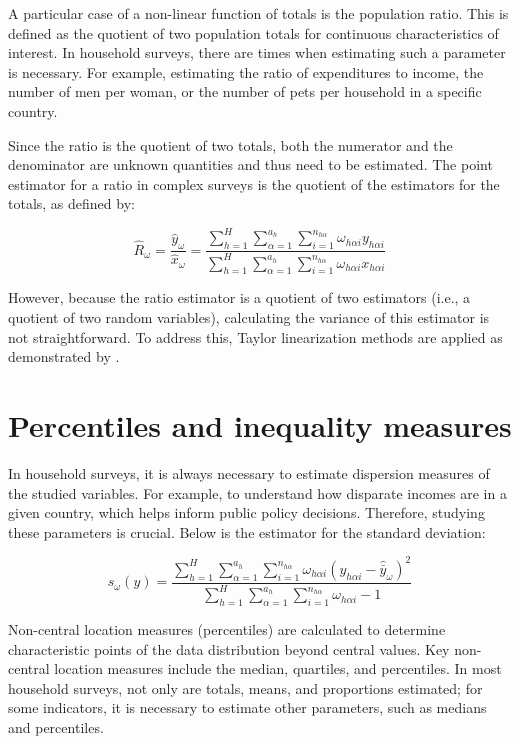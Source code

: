 \documentclass[
  12pt,
]{book}
\begin{document}
A particular case of a non-linear function of totals is the population ratio. This is defined as the quotient of two population totals for continuous characteristics of interest. In household surveys, there are times when estimating such a parameter is necessary. For example, estimating the ratio of expenditures to income, the number of men per woman, or the number of pets per household in a specific country.

Since the ratio is the quotient of two totals, both the numerator and the denominator are unknown quantities and thus need to be estimated. The point estimator for a ratio in complex surveys is the quotient of the estimators for the totals, as defined by:

\[
\hat{R}_{\omega} = \frac{\hat{y}_{\omega}}{\hat{x}_{\omega}}
= \frac{\sum_{h=1}^{H}\sum_{\alpha=1}^{a_{h}}\sum_{i=1}^{n_{h\alpha}}\omega_{h\alpha i}y_{h\alpha i}}{\sum_{h=1}^{H}\sum_{\alpha=1}^{a_{h}}\sum_{i=1}^{n_{h\alpha}}\omega_{h\alpha i}x_{h\alpha i}}
\]

However, because the ratio estimator is a quotient of two estimators (i.e., a quotient of two random variables), calculating the variance of this estimator is not straightforward. To address this, Taylor linearization methods are applied as demonstrated by \citet{Gutierrez_2016}.

\section{Percentiles and inequality measures}\label{percentiles-and-inequality-measures}

In household surveys, it is always necessary to estimate dispersion measures of the studied variables. For example, to understand how disparate incomes are in a given country, which helps inform public policy decisions. Therefore, studying these parameters is crucial. Below is the estimator for the standard deviation:

\[
s_{\omega}(y) = \frac{\sum_{h=1}^{H}\sum_{\alpha=1}^{a_{h}}\sum_{i=1}^{n_{h\alpha}}\omega_{h\alpha i}(y_{h\alpha i}-\hat{\bar{y}}_{\omega})^{2}}{\sum_{h=1}^{H}\sum_{\alpha=1}^{a_{h}}\sum_{i=1}^{n_{h\alpha}}\omega_{h\alpha i}-1}
\]

Non-central location measures (percentiles) are calculated to determine characteristic points of the data distribution beyond central values. Key non-central location measures include the median, quartiles, and percentiles. In most household surveys, not only are totals, means, and proportions estimated; for some indicators, it is necessary to estimate other parameters, such as medians and percentiles.
\end{document}
